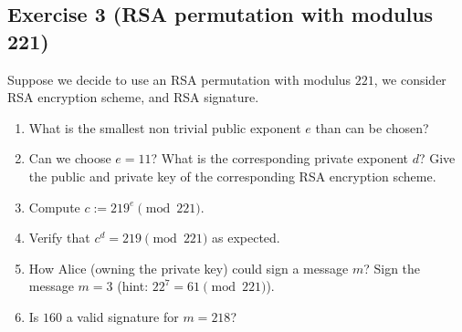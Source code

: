 \subsection{Exercise 3 (RSA permutation with modulus 221)}
Suppose we decide to use an RSA permutation with modulus $221$, we consider RSA encryption scheme, and RSA signature.
\begin{enumerate}
	\item What is the smallest non trivial public exponent $e$ than can be
	chosen?
	\item Can we choose $e=11$? What is the corresponding private exponent $d$? Give the public and private key of the corresponding RSA encryption scheme.
	\item Compute $c := 219^e \pmod{221}$.
	\item Verify that $c^d = 219 \pmod{221}$ as expected.\\
	
	\item How Alice (owning the private key) could sign a message $m$? Sign the message $m=3$ (hint: $22^7= 61 \pmod{221}$).
	\item Is $160$ a valid signature for $m=218$?
\end{enumerate}
